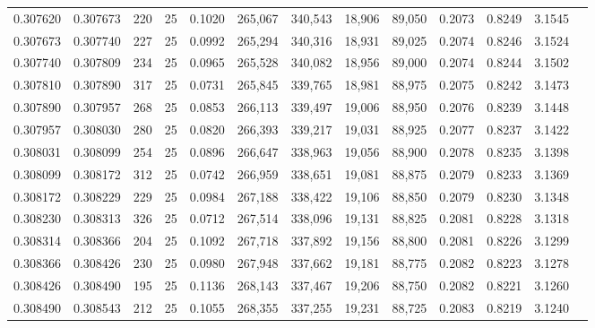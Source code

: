 \begin{tabular}{rrrrrrrrrrrrr}
0.307620 & 0.307673 &   220 &  25 &                                     0.1020 & 265,067 & 340,543 &  18,906 &  89,050 & 0.2073 & 0.8249 & 3.1545 \\
0.307673 & 0.307740 &   227 &  25 &                                     0.0992 & 265,294 & 340,316 &  18,931 &  89,025 & 0.2074 & 0.8246 & 3.1524 \\
0.307740 & 0.307809 &   234 &  25 &                                     0.0965 & 265,528 & 340,082 &  18,956 &  89,000 & 0.2074 & 0.8244 & 3.1502 \\
0.307810 & 0.307890 &   317 &  25 &                                     0.0731 & 265,845 & 339,765 &  18,981 &  88,975 & 0.2075 & 0.8242 & 3.1473 \\
0.307890 & 0.307957 &   268 &  25 &                                     0.0853 & 266,113 & 339,497 &  19,006 &  88,950 & 0.2076 & 0.8239 & 3.1448 \\
0.307957 & 0.308030 &   280 &  25 &                                     0.0820 & 266,393 & 339,217 &  19,031 &  88,925 & 0.2077 & 0.8237 & 3.1422 \\
0.308031 & 0.308099 &   254 &  25 &                                     0.0896 & 266,647 & 338,963 &  19,056 &  88,900 & 0.2078 & 0.8235 & 3.1398 \\
0.308099 & 0.308172 &   312 &  25 &                                     0.0742 & 266,959 & 338,651 &  19,081 &  88,875 & 0.2079 & 0.8233 & 3.1369 \\
0.308172 & 0.308229 &   229 &  25 &                                     0.0984 & 267,188 & 338,422 &  19,106 &  88,850 & 0.2079 & 0.8230 & 3.1348 \\
0.308230 & 0.308313 &   326 &  25 &                                     0.0712 & 267,514 & 338,096 &  19,131 &  88,825 & 0.2081 & 0.8228 & 3.1318 \\
0.308314 & 0.308366 &   204 &  25 &                                     0.1092 & 267,718 & 337,892 &  19,156 &  88,800 & 0.2081 & 0.8226 & 3.1299 \\
0.308366 & 0.308426 &   230 &  25 &                                     0.0980 & 267,948 & 337,662 &  19,181 &  88,775 & 0.2082 & 0.8223 & 3.1278 \\
0.308426 & 0.308490 &   195 &  25 &                                     0.1136 & 268,143 & 337,467 &  19,206 &  88,750 & 0.2082 & 0.8221 & 3.1260 \\
0.308490 & 0.308543 &   212 &  25 &                                     0.1055 & 268,355 & 337,255 &  19,231 &  88,725 & 0.2083 & 0.8219 & 3.1240 \\

\end{tabular}
